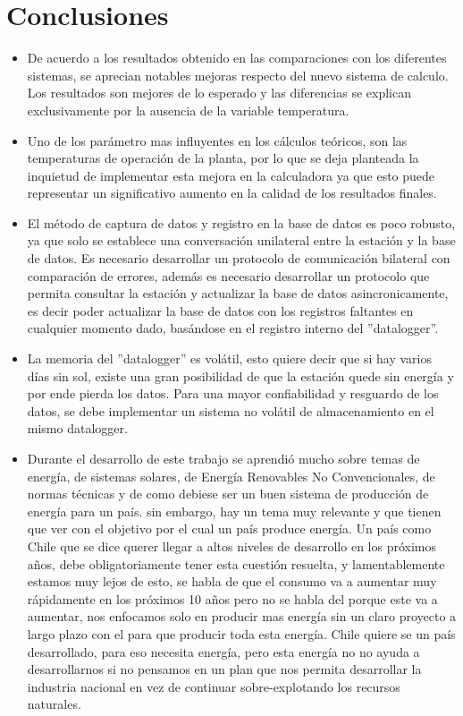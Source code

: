 \chapter{Conclusiones}
\label{conclusiones}

\begin{itemize}
\item De acuerdo a los resultados obtenido en las comparaciones con los diferentes sistemas, se aprecian notables mejoras respecto del nuevo sistema de calculo. Los resultados son mejores de lo esperado y las diferencias se explican exclusivamente por la ausencia de la variable temperatura.
\item Uno de los parámetro mas influyentes en los cálculos teóricos, son las temperaturas de operación de la planta, por lo que se deja planteada la inquietud de implementar esta mejora en la calculadora ya que esto puede representar un significativo aumento en la calidad de los resultados finales.
\item El método de captura de datos y registro en la base de datos es poco robusto, ya que solo se establece una conversación unilateral entre la estación y la base de datos. Es necesario desarrollar un protocolo de comunicación bilateral con comparación de errores, además es necesario desarrollar un protocolo que permita consultar la estación y actualizar la base de datos asincronicamente, es decir poder actualizar la base de datos con los registros faltantes en cualquier momento dado, basándose en el registro interno del ''datalogger''.
\item La memoria del ''datalogger'' es volátil, esto quiere decir que si hay varios días sin sol, existe una gran posibilidad de que la estación quede sin energía y por ende pierda los datos. Para una mayor confiabilidad y resguardo de los datos, se debe implementar un sistema no volátil de almacenamiento en el mismo datalogger.
\item Durante el desarrollo de este trabajo se aprendió mucho sobre temas de energía, de sistemas solares, de Energía Renovables No Convencionales, de normas técnicas y de como debiese ser un buen sistema de producción de energía para un país. sin embargo, hay un tema muy relevante y que tienen que ver con el objetivo por el cual un país produce energía. Un país como Chile que se dice querer llegar a altos niveles de desarrollo en los próximos años, debe obligatoriamente tener esta cuestión resuelta, y lamentablemente estamos muy lejos de esto, se habla de que el consumo va a aumentar muy rápidamente en los próximos 10 años pero no se habla del porque este va a aumentar, nos enfocamos solo en producir mas energía sin un claro proyecto a largo plazo con el para que producir toda esta energía. Chile quiere se un país desarrollado, para eso necesita energía, pero esta energía no no ayuda a desarrollarnos si no pensamos en un plan que nos permita desarrollar la industria nacional en vez de continuar sobre-explotando los recursos naturales.

\end{itemize}
